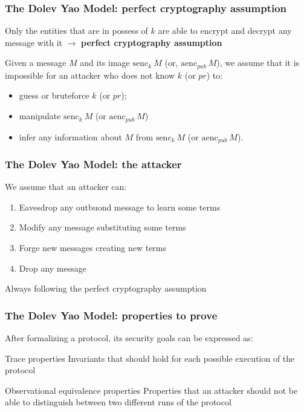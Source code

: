 \documentclass[aspectratio=169,t,xcolor=table]{beamer}
\begin{document}
\begin{frame}
    \frametitle{The Dolev Yao Model: perfect cryptography assumption}

    Only the entities that are in possess of $k$ are able to encrypt and decrypt any message with it $\to$ \textbf{perfect cryptography assumption}

    Given a message $M$ and its image $\textrm{senc}_k\ M$ (or, $\textrm{aenc}_{pub}\ M$), we assume that it is impossible for an attacker who does not know $k$ (or $pr$) to:

    \begin{itemize}
        \item guess or bruteforce $k$ (or $pr$);
        \item manipulate $\textrm{senc}_k\ M$ (or $\textrm{aenc}_{pub}\ M$)
        \item infer any information about $M$ from $\textrm{senc}_k\ M$ (or $\textrm{aenc}_{pub}\ M$).
    \end{itemize}    
\end{frame}

\begin{frame}
    \frametitle{The Dolev Yao Model: the attacker}

    We assume that an attacker can:

    \begin{enumerate}
        \item Eavesdrop any outbuond message to learn some terms
        \item Modify any message substituting some terms
        \item Forge new messages creating new terms
        \item Drop any message
    \end{enumerate}

    Always following the perfect cryptography assumption
\end{frame}

\begin{frame}
    \frametitle{The Dolev Yao Model: properties to prove}

    After formalizing a protocol, its security goals can be expressed as:

    \begin{block}{Trace properties}
        Invariants that should hold for each possible execution of the protocol
    \end{block}

    \begin{block}{Observational equivalence properties}
        Properties that an attacker should not be able to distinguish between two different runs of the protocol
    \end{block}
\end{frame}
\end{document}
